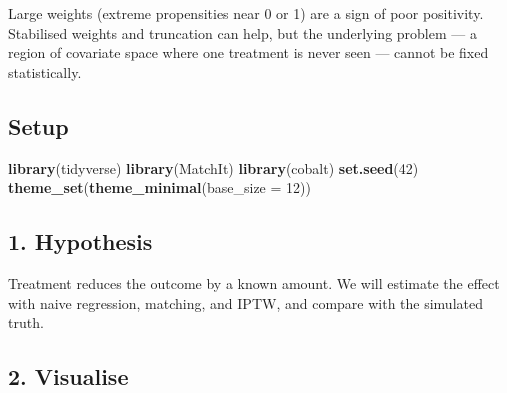 \documentclass[
]{article}
\newenvironment{Shaded}{\begin{snugshade}}{\end{snugshade}}
\newcommand{\AttributeTok}[1]{\textcolor[rgb]{0.13,0.29,0.53}{#1}}
\newcommand{\DecValTok}[1]{\textcolor[rgb]{0.00,0.00,0.81}{#1}}
\newcommand{\FunctionTok}[1]{\textcolor[rgb]{0.13,0.29,0.53}{\textbf{#1}}}
\newcommand{\NormalTok}[1]{#1}
\begin{document}
Large weights (extreme propensities near 0 or 1) are a sign of poor
positivity. Stabilised weights and truncation can help, but the
underlying problem --- a region of covariate space where one treatment
is never seen --- cannot be fixed statistically.

\subsection{Setup}\label{setup}

\begin{Shaded}
\begin{Highlighting}[]
\FunctionTok{library}\NormalTok{(tidyverse)}
\FunctionTok{library}\NormalTok{(MatchIt)}
\FunctionTok{library}\NormalTok{(cobalt)}
\FunctionTok{set.seed}\NormalTok{(}\DecValTok{42}\NormalTok{)}
\FunctionTok{theme\_set}\NormalTok{(}\FunctionTok{theme\_minimal}\NormalTok{(}\AttributeTok{base\_size =} \DecValTok{12}\NormalTok{))}
\end{Highlighting}
\end{Shaded}

\subsection{1. Hypothesis}\label{hypothesis}

Treatment reduces the outcome by a known amount. We will estimate the
effect with naive regression, matching, and IPTW, and compare with the
simulated truth.

\subsection{2. Visualise}\label{visualise}
\end{document}
